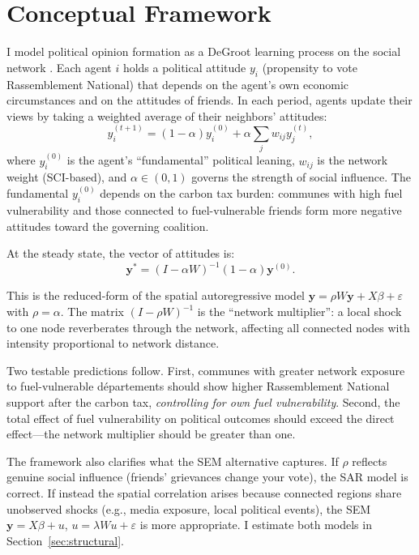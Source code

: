 \documentclass[12pt]{article}
\newcommand{\rn}{Rassemblement National}
\newcommand{\depts}{d\'{e}partements}
\begin{document}
\section{Conceptual Framework}
\label{sec:framework}

I model political opinion formation as a DeGroot learning process on the social network \citep{degroot1974reaching, golub2010naive}. Each agent $i$ holds a political attitude $y_i$ (propensity to vote \rn{}) that depends on the agent's own economic circumstances and on the attitudes of friends. In each period, agents update their views by taking a weighted average of their neighbors' attitudes:
\begin{equation}
y_i^{(t+1)} = (1 - \alpha) y_i^{(0)} + \alpha \sum_j w_{ij} y_j^{(t)},
\label{eq:degroot}
\end{equation}
where $y_i^{(0)}$ is the agent's ``fundamental'' political leaning, $w_{ij}$ is the network weight (SCI-based), and $\alpha \in (0,1)$ governs the strength of social influence. The fundamental $y_i^{(0)}$ depends on the carbon tax burden: communes with high fuel vulnerability and those connected to fuel-vulnerable friends form more negative attitudes toward the governing coalition.

At the steady state, the vector of attitudes is:
\begin{equation}
\mathbf{y}^* = (I - \alpha W)^{-1} (1-\alpha) \mathbf{y}^{(0)}.
\label{eq:steady_state}
\end{equation}

This is the reduced-form of the spatial autoregressive model $\mathbf{y} = \rho W \mathbf{y} + X\beta + \varepsilon$ with $\rho = \alpha$. The matrix $(I - \rho W)^{-1}$ is the ``network multiplier'': a local shock to one node reverberates through the network, affecting all connected nodes with intensity proportional to network distance.

Two testable predictions follow. First, communes with greater network exposure to fuel-vulnerable \depts{} should show higher \rn{} support after the carbon tax, \emph{controlling for own fuel vulnerability}. Second, the total effect of fuel vulnerability on political outcomes should exceed the direct effect---the network multiplier should be greater than one.

The framework also clarifies what the SEM alternative captures. If $\rho$ reflects genuine social influence (friends' grievances change your vote), the SAR model is correct. If instead the spatial correlation arises because connected regions share unobserved shocks (e.g., media exposure, local political events), the SEM $\mathbf{y} = X\beta + u$, $u = \lambda W u + \varepsilon$ is more appropriate. I estimate both models in Section~\ref{sec:structural}.
\end{document}
